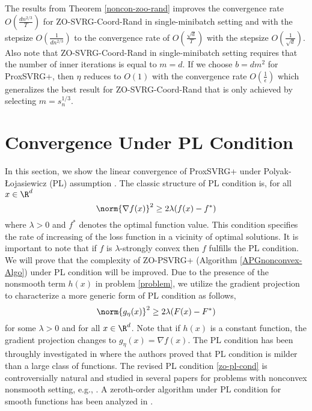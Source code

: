 \begin{remark}
The results from Theorem \ref{noncon-zoo-rand} improves the convergence rate $O(\frac{d{n}^{2/3}}{T})$ for ZO-SVRG-Coord-Rand \cite{ji2019improved} in single-minibatch setting  and   with the stepsize $O(\frac{1}{dn^{2/3}})$ to the convergence rate of $O(\frac{\sqrt{d}}{T})$
with the stepsize $O(\frac{1}{\sqrt{d}})$. Also note that ZO-SVRG-Coord-Rand in single-minibatch setting requires that the number of inner iterations is equal to $m = d$. If we
choose $b = d m^2$ for ProxSVRG+, then $\eta$ reduces to $O(1)$ with the convergence rate $O(\frac{1}{\epsilon})$ which generalizes the best result for ZO-SVRG-Coord-Rand that is only achieved by selecting $m = s_n^{1/3}$.
\end{remark}
\section{Convergence Under PL Condition}
In this section, we show the linear convergence of  ProxSVRG+ under Polyak-Łojasiewicz (PL) assumption \cite{polyak1963gradient}.
The classic structure of PL condition is, for all $x\in\R^d$
\begin{equation}
\norm{\nabla f(x)}^2 \geq 2\lambda (f(x) - f^*)
\end{equation}
where $\lambda >0$ and $f^*$ denotes the optimal function value. This condition specifies the rate of increasing of the loss function in a vicinity of optimal solutions. It is important to note that if $f$ is $\lambda$-strongly convex then $f$ fulfills the PL condition. We will prove that the complexity of ZO-PSVRG+ (Algorithm \ref{APGnonconvex-Algo}) under PL condition will be improved.
Due to the presence of the nonsmooth term $h(x)$ in problem \eqref{problem}, we utilize the gradient projection to characterize a more generic form of PL condition as follows, 
\begin{equation}\label{zo-pl-cond}
\norm{g_{\eta}(x)}^2 \geq 2\lambda (F(x) - F^*)
\end{equation}
for some $\lambda >0$ and for all $x\in\R^d$. Note that if $h(x)$ is a constant function, the gradient projection changes to $g_{\eta}(x) = \nabla f(x)$.
The PL condition has been throughly investigated  in \cite{karimi2016linear} where the authors proved that PL condition is milder than a large class of  functions. The revised PL condition \eqref{zo-pl-cond} is controversially natural and studied in several papers for problems with nonconvex nonsmooth setting, e.g., \cite{li2018simple}. A zeroth-order algorithm under PL condition for smooth functions has been analyzed in \cite{ji2019improved}.

